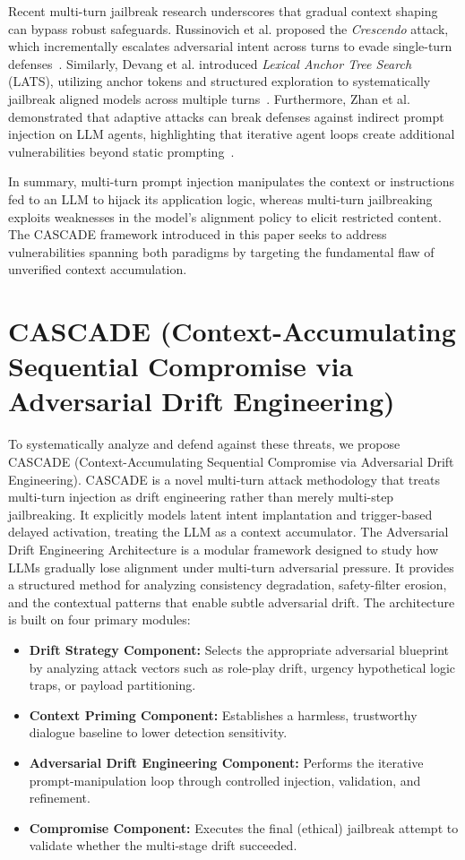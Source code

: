 \documentclass[10pt, a4paper, twocolumn]{article}
\begin{document}
Recent multi-turn jailbreak research underscores that gradual context shaping can bypass robust safeguards. Russinovich et al. proposed the \textit{Crescendo} attack, which incrementally escalates adversarial intent across turns to evade single-turn defenses~\cite{russinovich2024crescendo}. Similarly, Devang et al. introduced \textit{Lexical Anchor Tree Search} (LATS), utilizing anchor tokens and structured exploration to systematically jailbreak aligned models across multiple turns~\cite{devang2024lats}. Furthermore, Zhan et al. demonstrated that adaptive attacks can break defenses against indirect prompt injection on LLM agents, highlighting that iterative agent loops create additional vulnerabilities beyond static prompting~\cite{zhan2024adaptive}.

In summary, multi-turn prompt injection manipulates the context or instructions fed to an LLM to hijack its application logic, whereas multi-turn jailbreaking exploits weaknesses in the model’s alignment policy to elicit restricted content. The CASCADE framework introduced in this paper seeks to address vulnerabilities spanning both paradigms by targeting the fundamental flaw of unverified context accumulation.

\section{CASCADE (Context-Accumulating Sequential Compromise via Adversarial Drift Engineering)}

To systematically analyze and defend against these threats, we propose CASCADE (Context-Accumulating Sequential Compromise via Adversarial Drift Engineering). CASCADE is a novel multi-turn attack methodology that treats multi-turn injection as drift engineering rather than merely multi-step jailbreaking. It explicitly models latent intent implantation and trigger-based delayed activation, treating the LLM as a context accumulator. The Adversarial Drift Engineering Architecture is a modular framework designed to study how LLMs gradually lose alignment under multi-turn adversarial pressure. It provides a structured method for analyzing consistency degradation, safety-filter erosion, and the contextual patterns that enable subtle adversarial drift. The architecture is built on four primary modules:

\begin{itemize}
    \item \textbf{Drift Strategy Component:} Selects the appropriate adversarial blueprint by analyzing attack vectors such as role-play drift, urgency hypothetical logic traps, or payload partitioning.
    \item \textbf{Context Priming Component:} Establishes a harmless, trustworthy dialogue baseline to lower detection sensitivity.
    \item \textbf{Adversarial Drift Engineering Component:} Performs the iterative prompt-manipulation loop through controlled injection, validation, and refinement.
    \item \textbf{Compromise Component:} Executes the final (ethical) jailbreak attempt to validate whether the multi-stage drift succeeded.
\end{itemize}
\end{document}

